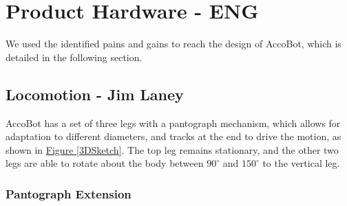 \documentclass[11pt]{article}		%
\newcommand{\figref}[1]{\hyperref[#1]{Figure \ref*{#1}}}    %
\begin{document}
		\section{Product Hardware - ENG}
		
		We used the identified pains and gains to reach the design of AccoBot, which is detailed in the following section.
	
		\subsection[Locomotion]{Locomotion - Jim Laney} \label{Lomcotion}
		
			AccoBot has a set of three legs with a pantograph mechanism, which allows for adaptation to different diameters, and tracks at the end to drive the motion, as shown in \figref{3DSketch}.
			The top leg remains stationary, and the other two legs are able to rotate about the body between $90^\circ$ and $150^\circ$ to the vertical leg.
			
			\subsubsection{Pantograph Extension}
			
\end{document}
